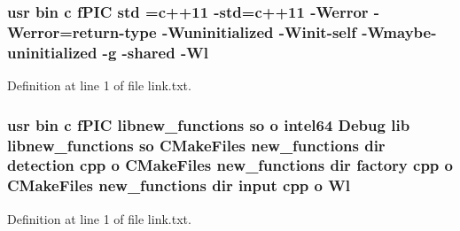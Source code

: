 \subsubsection[{\texorpdfstring{std}{std}}]{\setlength{\rightskip}{0pt plus 5cm}usr bin {\bf c} f\+P\+IC std ={\bf c}++11 -\/std={\bf c}++11 -\/Werror -\/Werror=return-\/type -\/Wuninitialized -\/Winit-\/self -\/Wmaybe-\/uninitialized -\/g -\/shared -\/{\bf Wl}}\hypertarget{common_2new__functions_2CMakeFiles_2new__functions_8dir_2link_8txt_a5f87c8f8e33670f7c8c5221b6be1bcc4}{}\label{common_2new__functions_2CMakeFiles_2new__functions_8dir_2link_8txt_a5f87c8f8e33670f7c8c5221b6be1bcc4}


Definition at line 1 of file link.\+txt.

\subsubsection[{\texorpdfstring{Wl}{Wl}}]{\setlength{\rightskip}{0pt plus 5cm}usr bin {\bf c} f\+P\+IC libnew\+\_\+functions {\bf so} o intel64 Debug lib libnew\+\_\+functions {\bf so} C\+Make\+Files new\+\_\+functions dir detection cpp o C\+Make\+Files new\+\_\+functions dir factory cpp o C\+Make\+Files new\+\_\+functions dir input cpp o Wl}\hypertarget{common_2new__functions_2CMakeFiles_2new__functions_8dir_2link_8txt_a0596de7a6efcd0247ff6e5eeab4ed988}{}\label{common_2new__functions_2CMakeFiles_2new__functions_8dir_2link_8txt_a0596de7a6efcd0247ff6e5eeab4ed988}


Definition at line 1 of file link.\+txt.

